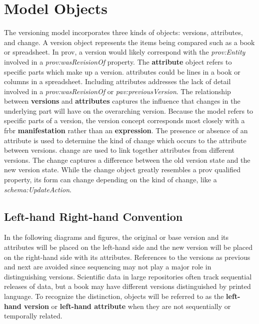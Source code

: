 \section{Model Objects} \label{sec:model}

The versioning model incorporates three kinds of objects: \glspl{version}, \glspl{attribute}, and \gls{change}.
A \gls{version} object represents the items being compared such as a book or spreadsheet.
In \gls{prov}, a \gls{version} would likely correspond with the \textit{prov:Entity} involved in a \textit{prov:wasRevisionOf} property.
The \textbf{attribute} object refers to specific parts which make up a \gls{version}.
\Glspl{attribute} could be lines in a book or columns in a spreadsheet.
Including \glspl{attribute} addresses the lack of detail involved in a \textit{prov:wasRevisionOf} or \textit{pav:previousVersion}.
The relationship between \textbf{versions} and \textbf{attributes} captures the influence that changes in the underlying part will have on the overarching \gls{version}.
Because the model refers to specific parts of a \gls{version}, the \gls{version} concept corresponds most closely with a \gls{frbr} \textbf{manifestation} rather than an \textbf{expression}.
The presence or absence of an \gls{attribute} is used to determine the kind of \gls{change} which occurs to the \gls{attribute} between \glspl{version}.
\Gls{change} are used to link together \glspl{attribute} from different \glspl{version}.
The \gls{change} captures a difference between the old \gls{version} state and the new \gls{version} state.
While the \gls{change} object greatly resembles a \gls{prov} qualified property, its form can change depending on the kind of \gls{change}, like a \textit{schema:UpdateAction}.

\subsection{Left-hand Right-hand Convention}

In the following diagrams and figures, the original or base \gls{version} and its \glspl{attribute} will be placed on the left-hand side and the new \gls{version} will be placed on the right-hand side with its \glspl{attribute}.
References to the \glspl{version} as previous and next are avoided since sequencing may not play a major role in distinguishing \glspl{version}.
Scientific data in large repositories often track sequential releases of data, but a book may have different \glspl{version} distinguished by printed language.
To recognize the distinction, objects will be referred to as the \textbf{left-hand version} or \textbf{left-hand attribute} when they are not sequentially or temporally related.

